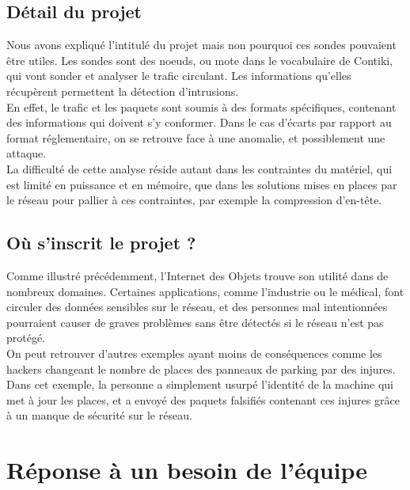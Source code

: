 	\subsection{Détail du projet}
		Nous avons expliqué l'intitulé du projet mais non pourquoi ces sondes pouvaient être utiles. Les sondes sont des noeuds, ou mote dans le vocabulaire de Contiki, qui vont sonder et analyser le trafic circulant. Les informations qu'elles récupèrent permettent la détection d'intrusions. \\
		En effet, le trafic et les paquets sont soumis à des formats spécifiques, contenant des informations qui doivent s'y conformer. Dans le cas d'écarts par rapport au format réglementaire, on se retrouve face à une anomalie, et possiblement une attaque.\\
		La difficulté de cette analyse réside autant dans les contraintes du matériel, qui est limité en puissance et en mémoire, que dans les solutions mises en places par le réseau pour pallier à ces contraintes, par exemple la compression d'en-tête.
	\subsection{Où s'inscrit le projet ?}
		Comme illustré précédemment, l'Internet des Objets trouve son utilité dans de nombreux domaines. Certaines applications, comme l'industrie ou le médical, font circuler des données sensibles sur le réseau, et des personnes mal intentionnées pourraient causer de graves problèmes sans être détectés si le réseau n'est pas protégé.\\
		On peut retrouver d'autres exemples ayant moins de conséquences comme les hackers changeant le nombre de places des panneaux de parking par des injures. Dans cet exemple, la personne a simplement usurpé l'identité de la machine qui met à jour les places, et a envoyé des paquets falsifiés contenant ces injures grâce à un manque de sécurité sur le réseau.

\section{Réponse à un besoin de l'équipe}
	
